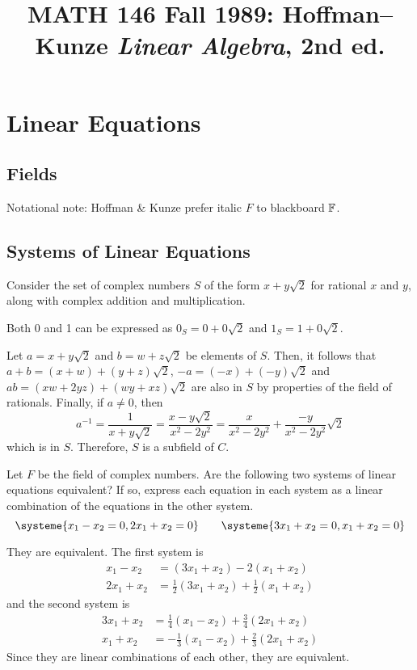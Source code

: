 \documentclass{agony}
\title{MATH 146 Fall 1989: Hoffman--Kunze \emph{Linear Algebra}, 2nd ed.}
\begin{document}
\thispagestyle{firstpage}
\tableofcontents

\section{Linear Equations}
\subsection{Fields}\label{sec:fields}
Notational note: Hoffman \& Kunze prefer italic $F$ to blackboard $\mathbb{F}$.

\subsection{Systems of Linear Equations}

\begin{prf}
  Consider the set of complex numbers $S$ of the form $x + y\sqrt2$ for rational $x$ and $y$,
  along with complex addition and multiplication.

  Both 0 and 1 can be expressed as $0_S = 0+0\sqrt2$ and $1_S = 1 + 0\sqrt2$.

  Let $a = x + y\sqrt2$ and $b = w + z\sqrt2$ be elements of $S$.
  Then, it follows that $a+b = (x+w) + (y+z)\sqrt2$, $-a = (-x) + (-y)\sqrt2$
  and $ab = (xw + 2yz) + (wy + xz)\sqrt2$ are also in $S$ by properties of the field of rationals.
  Finally, if $a \neq 0$, then
  \[ a^{-1} = \frac{1}{x+y\sqrt2} = \frac{x-y\sqrt2}{x^2-2y^2} = \frac{x}{x^2-2y^2} + \frac{-y}{x^2-2y^2}\sqrt2 \]
  which is in $S$.
  Therefore, $S$ is a subfield of $C$.
\end{prf}

\begin{xca}\label{xca:sysequiv}
  Let $F$ be the field of complex numbers.
  Are the following two systems of linear equations equivalent?
  If so, express each equation in each system as a linear combination of the equations in the other system.
  \[ \systeme{x_1-x_2=0, 2x_1+x_2=0} \qquad \systeme{3x_1+x_2=0, x_1+x_2=0} \]
\end{xca}
\begin{prf}
  They are equivalent. The first system is
  \begin{align*}
    x_1 - x_2  & = (3x_1 + x_2) - 2(x_1 + x_2)                \\
    2x_1 + x_2 & = \tfrac12(3x_1 + x_2) + \tfrac12(x_1 + x_2)
  \end{align*}
  and the second system is
  \begin{align*}
    3x_1 + x_2 & = \tfrac14(x_1 - x_2) + \tfrac34(2x_1 + x_2)  \\
    x_1 + x_2  & = -\tfrac13(x_1 - x_2) + \tfrac23(2x_1 + x_2)
  \end{align*}
  Since they are linear combinations of each other, they are equivalent.
\end{prf}
\end{document}
